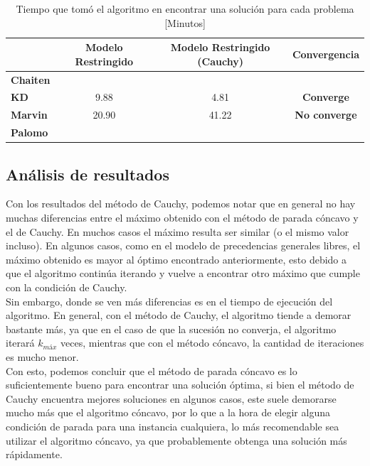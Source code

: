 \documentclass[12pt,letterpaper]{article}
\begin{document}
\begin{table}[H]
\centering
\begin{tabular}{|l|ccc|}
\hline
                 & \textbf{Modelo Restringido} & \textbf{Modelo Restringido (Cauchy)} & \textbf{Convergencia}  \\ \hline
\textbf{Chaiten} &               &            & \textbf{}                              \\ \hline
\textbf{KD}      &     9.88               &  4.81           & \textbf{Converge}                                     \\ \hline
\textbf{Marvin}  &  20.90                &     41.22         & \textbf{No converge}                                    \\ \hline
\textbf{Palomo}  &                  &             &      \textbf{}                              \\ \hline
\end{tabular}
\caption{Tiempo que tomó el algoritmo en encontrar una solución para cada problema
[Minutos]}

\end{table}

\subsection{Análisis de resultados}
Con los resultados del método de Cauchy, podemos notar que en general no hay muchas diferencias entre el máximo obtenido con el método de parada cóncavo y el de Cauchy. En muchos casos el máximo resulta ser similar (o el mismo valor incluso). En algunos casos, como en el modelo de precedencias generales libres, el máximo obtenido es mayor al óptimo encontrado anteriormente, esto debido a que el algoritmo continúa iterando y vuelve a encontrar otro máximo que cumple con la condición de Cauchy.\\
Sin embargo, donde se ven más diferencias es en el tiempo de ejecución del algoritmo. En general, con el método de Cauchy, el algoritmo tiende a demorar bastante más, ya que en el caso de que la sucesión no converja, el algoritmo iterará $k_{máx}$ veces, mientras que con el método cóncavo, la cantidad de iteraciones es mucho menor.\\

Con esto, podemos concluir que el método de parada cóncavo es lo suficientemente bueno para encontrar una solución óptima, si bien el método de Cauchy encuentra mejores soluciones en algunos casos, este suele demorarse mucho más que el algoritmo cóncavo, por lo que a la hora de elegir alguna condición de parada para una instancia cualquiera, lo más recomendable sea utilizar el algoritmo cóncavo, ya que probablemente obtenga una solución más rápidamente.
\end{document}
